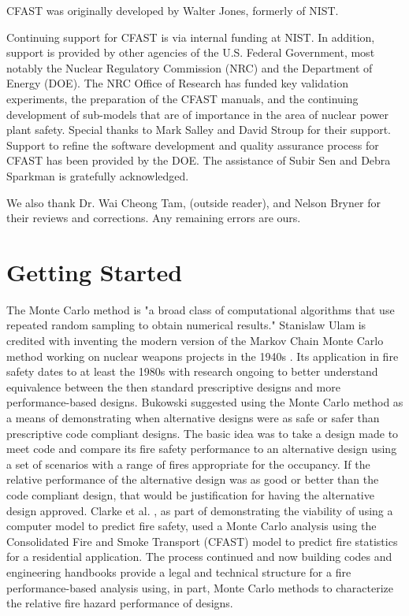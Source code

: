 \documentclass[12pt,twoside]{book}
\begin{document}
\label{acksection}

CFAST was originally developed by Walter Jones, formerly of NIST.

Continuing support for CFAST is via internal funding at NIST. In addition, support is provided by other agencies of the U.S. Federal Government, most notably the Nuclear Regulatory Commission (NRC) and the Department of Energy (DOE). The NRC Office of Research has funded key validation experiments, the preparation of the CFAST manuals, and the continuing development of sub-models that are of importance in the area of nuclear power plant safety. Special thanks to Mark Salley and David Stroup for their support. Support to refine the software development and quality assurance process for CFAST has been provided by the DOE. The assistance of Subir Sen and Debra Sparkman is gratefully acknowledged.

We also thank Dr. Wai Cheong Tam, (outside reader), and Nelson Bryner for their reviews and corrections. Any remaining errors are ours.

\cleardoublepage
\tableofcontents

\clearpage
\listoffigures

\listoftables


\mainmatter

%
%

\chapter{Getting Started}

The Monte Carlo method is "a broad class of computational algorithms that use repeated random sampling to obtain numerical results." \cite{wikipedia_montecarlo} Stanislaw Ulam is credited with inventing the modern version of the Markov Chain Monte Carlo method working on nuclear weapons projects in the 1940s \cite{Metropolis:1987}. Its application in fire safety dates to at least the 1980s with research ongoing to better understand equivalence between the then standard prescriptive designs and more performance-based designs. Bukowski \cite{Bukowski_1985} suggested using the Monte Carlo method as a means of demonstrating when alternative designs were as safe or safer than prescriptive code compliant designs. The basic idea was to take a design made to meet code and compare its fire safety performance to an alternative design using a set of scenarios with a range of fires appropriate for the occupancy. If the relative performance of the alternative design was as good or better than the code compliant design, that would be justification for having the alternative design approved. Clarke et al. \cite{Clarke_1990}, as part of demonstrating the viability of using a computer model to predict fire safety, used a Monte Carlo analysis using the Consolidated Fire and Smoke Transport (CFAST) model to predict fire statistics for a residential application. The process continued and now building codes \cite{NFPA_5000} and engineering handbooks \cite{Hurley_2016} provide a legal and technical structure for a fire performance-based analysis using, in part, Monte Carlo methods to characterize the relative fire hazard performance of designs.
\end{document}
